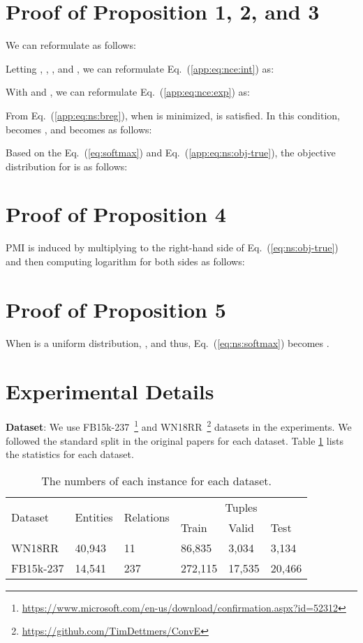 \onecolumn
\section{Proof of Proposition 1, 2, and 3}
\label{breg:ns:details}
We can reformulate  as follows:

Letting , , , and , we can reformulate Eq.~(\ref{app:eq:nce:int}) as:

With  and , we can reformulate Eq.~(\ref{app:eq:nce:exp}) as:

From Eq.~(\ref{app:eq:ns:breg}), when  is minimized,  is satisfied. In this condition,  becomes , and  becomes  as follows:

Based on the Eq.~(\ref{eq:softmax}) and  Eq.~(\ref{app:eq:ns:obj-true}), the objective distribution for  is as follows:


\section{Proof of Proposition 4}
\label{app:proof:pmi}
PMI is induced by multiplying  to the right-hand side of Eq.~(\ref{eq:ns:obj-true}) and then computing logarithm for both sides as follows:


\section{Proof of Proposition 5}
\label{app:proof:uninoise}
When  is a uniform distribution, , and thus, Eq.~(\ref{eq:ns:softmax}) becomes .

\section{Experimental Details}
\label{app:params}

\noindent\textbf{Dataset}: We use FB15k-237~\cite{toutanova-chen-2015-observed}\footnote{\url{https://www.microsoft.com/en-us/download/confirmation.aspx?id=52312}} and WN18RR~\cite{dettmers2018conve}\footnote{\url{https://github.com/TimDettmers/ConvE}} datasets in the experiments. We followed the standard split in the original papers for each dataset. Table \ref{tab:app:data} lists the statistics for each dataset.
\begin{table}[h!]
    \centering
    \small
    \begin{tabular}{llllll}
    \toprule
    \multirow{2}{*}{Dataset}&\multirow{2}{*}{Entities}&\multirow{2}{*}{Relations}&\multicolumn{3}{c}{Tuples}\\
    \cmidrule(lr){4-6}
 &  &  & Train & Valid & Test\\
    \midrule
WN18RR &40,943 &11 &86,835 &3,034 &3,134\\
FB15k-237 &14,541 &237 &272,115 &17,535& 20,466  \\
\bottomrule
    \end{tabular}
    \caption{The numbers of each instance for each dataset.}
    \label{tab:app:data}
\end{table}

